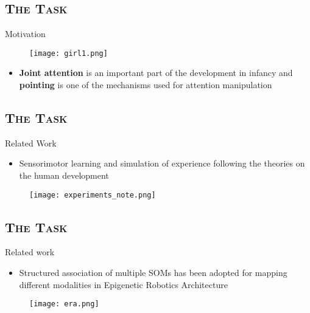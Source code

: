 \documentclass[xcolor=x11names,dvipsnames,compress]{beamer}
\renewcommand{\(}{\begin{columns}}
\renewcommand{\)}{\end{columns}}
\newcommand{\<}[1]{\begin{column}{#1}}
\renewcommand{\>}{\end{column}}
\begin{document}
\subsection{\scshape The Task}
\begin{frame}{Motivation}
 
  \begin{figure}[h!]  
  \centering
  \texttt{[image: girl1.png]}
  \end{figure}  
  
  \begin{itemize}
  \item \textbf{Joint attention} is an important part of the development in infancy and \textbf{pointing} is one of the mechanisms used for attention manipulation
  \end{itemize}
\end{frame}

\subsection{\scshape The Task}
\begin{frame}{Related Work}
  \begin{itemize}
   \item  Sensorimotor learning and simulation of experience following the theories on the human development \cite{Schillaci}
  \end{itemize}
    \begin{figure}
    \centering
      \texttt{[image: experiments\_note.png]}
    \end{figure}
  
\end{frame}


\subsection{\scshape The Task}
\begin{frame}{Related work}
\begin{itemize}  
 \item Structured association of multiple SOMs has been adopted for mapping different modalities in Epigenetic Robotics Architecture \cite{Morse2010}
\end{itemize}
    \begin{figure}
    \centering
      \texttt{[image: era.png]}
    \end{figure}
\end{frame}
\end{document}
